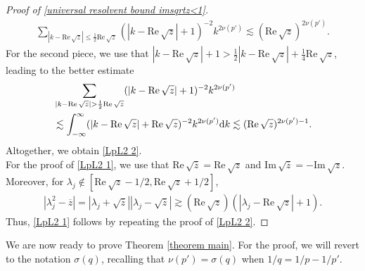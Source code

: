 \documentclass[12pt]{amsart}
\newcommand{\rd}{{\rm d}}
\newcommand\re{\mathrm{Re}\,}
\newcommand\im{\mathrm{Im}\,}
\begin{document}
\begin{proof}[Proof of \eqref{universal resolvent bound imsqrtz<1}]
\begin{align}
    \sum_{|k-\re\sqrt{z}|\leq \frac{1}{2}\re\sqrt{z}}(|k-\re\sqrt{z}|+1)^{-2}k^{2\nu(p')}\lesssim (\re\sqrt{z})^{2\nu(p')}.
\end{align}
For the second piece, we use that $|k-\re\sqrt{z}|+1>\frac{1}{2}|k-\re\sqrt{z}|+\frac{1}{4}\re\sqrt{z}$, leading to the better estimate
\begin{align}
    &\sum_{|k-\re\sqrt{z}|> \frac{1}{2}\re\sqrt{z}}(|k-\re\sqrt{z}|+1)^{-2}k^{2\nu(p')}\\
    &\lesssim \int_{-\infty}^{\infty}(|k-\re\sqrt{z}|+\re\sqrt{z})^{-2}k^{2\nu(p')}\rd k
    \lesssim (\re\sqrt{z})^{2\nu(p')-1}.
\end{align}
Altogether, we obtain \eqref{LpL2 2}.\\

For the proof of \eqref{LpL2 1}, we use that $\re\sqrt{\overline{z}}=\re\sqrt{z}$ and $\im\sqrt{\overline{z}}=-\im\sqrt{z}$. Moreover, for $\lambda_j\notin [\re\sqrt{z}-1/2,\re\sqrt{z}+1/2]$,
\begin{align}
 |\lambda_j^2-\overline{z}|=|\lambda_j+\sqrt{\overline{z}}||\lambda_j-\sqrt{\overline{z}}|\gtrsim (\re\sqrt{z})(|\lambda_j-\re\sqrt{z}|+1).
\end{align}
Thus, \eqref{LpL2 1} follows by repeating the proof of \eqref{LpL2 2}.
\end{proof}

We are now ready to prove Theorem \ref{theorem main}. For the proof, we will revert to the notation $\sigma(q)$, recalling that $\nu(p')=\sigma(q)$ when $1/q=1/p-1/p'$.
\end{document}
